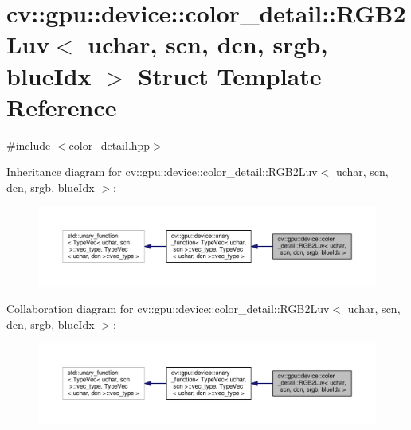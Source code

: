\hypertarget{structcv_1_1gpu_1_1device_1_1color__detail_1_1RGB2Luv_3_01uchar_00_01scn_00_01dcn_00_01srgb_00_01blueIdx_01_4}{\section{cv\-:\-:gpu\-:\-:device\-:\-:color\-\_\-detail\-:\-:R\-G\-B2\-Luv$<$ uchar, scn, dcn, srgb, blue\-Idx $>$ Struct Template Reference}
\label{structcv_1_1gpu_1_1device_1_1color__detail_1_1RGB2Luv_3_01uchar_00_01scn_00_01dcn_00_01srgb_00_01blueIdx_01_4}
}


{\ttfamily \#include $<$color\-\_\-detail.\-hpp$>$}



Inheritance diagram for cv\-:\-:gpu\-:\-:device\-:\-:color\-\_\-detail\-:\-:R\-G\-B2\-Luv$<$ uchar, scn, dcn, srgb, blue\-Idx $>$\-:\nopagebreak
\begin{figure}[H]
\begin{center}
\leavevmode
\includegraphics[width=350pt]{structcv_1_1gpu_1_1device_1_1color__detail_1_1RGB2Luv_3_01uchar_00_01scn_00_01dcn_00_01srgb_00_01blueIdx_01_4__inherit__graph}
\end{center}
\end{figure}


Collaboration diagram for cv\-:\-:gpu\-:\-:device\-:\-:color\-\_\-detail\-:\-:R\-G\-B2\-Luv$<$ uchar, scn, dcn, srgb, blue\-Idx $>$\-:\nopagebreak
\begin{figure}[H]
\begin{center}
\leavevmode
\includegraphics[width=350pt]{structcv_1_1gpu_1_1device_1_1color__detail_1_1RGB2Luv_3_01uchar_00_01scn_00_01dcn_00_01srgb_00_01blueIdx_01_4__coll__graph}
\end{center}
\end{figure}
